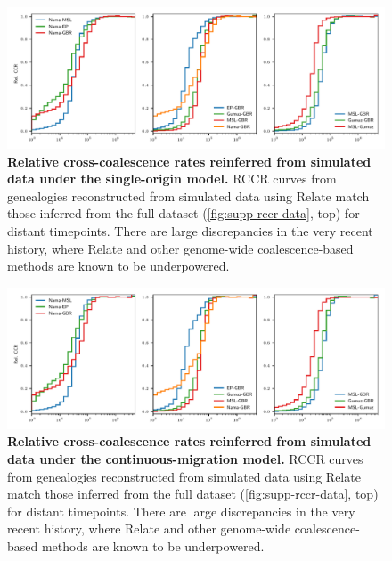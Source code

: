 \documentclass[]{article}
\begin{document}
\begin{figure}[ht]
    \centering
    \includegraphics[width=\textwidth]{figures/supp-relate-rccr-single-origin}
    \caption{
        \textbf{Relative cross-coalescence rates reinferred from simulated data
        under the single-origin model.} RCCR curves from genealogies
        reconstructed from simulated data using Relate match those inferred
        from the full dataset (\ref{fig:supp-rccr-data}, top) for distant
        timepoints. There are large discrepancies in the very recent history,
        where Relate and other genome-wide coalescence-based methods are known
        to be underpowered.
    }
    \label{fig:supp-rccr-single-origin}
\end{figure}

\begin{figure}[ht]
    \centering
    \includegraphics[width=\textwidth]{figures/supp-relate-rccr-continuous-migration}
    \caption{
        \textbf{Relative cross-coalescence rates reinferred from simulated data
        under the continuous-migration model.} RCCR curves from genealogies
        reconstructed from simulated data using Relate match those inferred
        from the full dataset (\ref{fig:supp-rccr-data}, top) for distant
        timepoints. There are large discrepancies in the very recent history,
        where Relate and other genome-wide coalescence-based methods are known
        to be underpowered.
    }
    \label{fig:supp-rccr-continuous-migration}
\end{figure}
\end{document}
